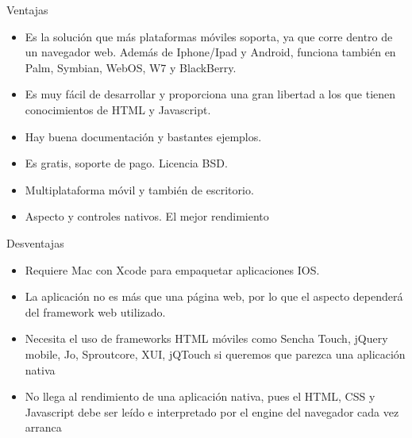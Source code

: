 Ventajas
\setlength{\parskip}{0mm}
\begin{itemize}

\item Es la solución que más plataformas móviles soporta, ya que corre dentro de un navegador web. Además de Iphone/Ipad y Android, funciona también en Palm, Symbian, WebOS, W7 y BlackBerry.

\item Es muy fácil de desarrollar y proporciona una gran libertad a los que tienen conocimientos de HTML y Javascript.

\item Hay buena documentación y bastantes ejemplos.

\item Es gratis, soporte de pago. Licencia BSD.

\item Multiplataforma móvil y también de escritorio.

\item Aspecto y controles nativos. El mejor rendimiento

\end{itemize}

Desventajas

\begin{itemize}

\item Requiere Mac con Xcode para empaquetar aplicaciones IOS.

\item  La aplicación no es más que una página web, por lo que el aspecto dependerá del framework web utilizado.

\item  Necesita el uso de frameworks HTML móviles como Sencha Touch, jQuery mobile, Jo, Sproutcore, XUI, jQTouch si queremos que parezca una aplicación nativa

\item  No llega al rendimiento de una aplicación nativa, pues el HTML, CSS y Javascript debe ser leído e interpretado por el engine del navegador cada vez arranca

\end{itemize}


